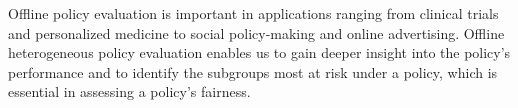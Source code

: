 Offline policy evaluation is important in applications ranging from clinical trials and personalized medicine to social policy-making and online advertising. Offline heterogeneous policy evaluation enables us to gain deeper insight into the policy's performance and to identify the subgroups most at risk under a policy, which is essential in assessing a policy's fairness.




 